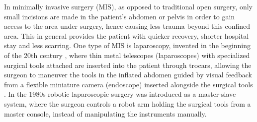 In minimally invasive surgery (MIS), as opposed to traditional open surgery, only small incisions are made in the patient's abdomen or pelvis in order to gain access to the area under surgery, hence causing less trauma beyond this confined area. This in general provides the patient with quicker recovery, shorter hospital stay and less scarring.
One type of MIS is laparoscopy, invented in the beginning of the 20th century \citep{bib:laparoscopy}, where thin metal telescopes (laparoscopes) with specialized surgical tools attached are inserted into the patient through trocars, allowing the surgeon to maneuver the tools in the inflated abdomen guided by visual feedback from a flexible miniature camera (endoscope) inserted alongside the surgical tools \citep{bib:fascrs}.
In the 1980s robotic laparoscopic surgery was introduced as a master-slave system, where the surgeon controls a robot arm holding the surgical tools from a master console, instead of manipulating the instruments manually.

